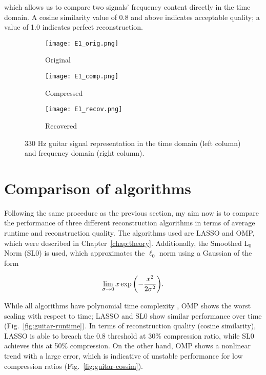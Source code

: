 \noindent which allows us to compare two signals' frequency content directly in the time domain. A cosine similarity value of 0.8 and above indicates acceptable quality; a value of 1.0 indicates perfect reconstruction.

\begin{figure}[htb]
	\centering
	\begin{subfigure}{\textwidth}
		\centering
		\texttt{[image: E1\_orig.png]}
		\caption{Original}
		\label{fig:guitar-original}
	\end{subfigure}
	\begin{subfigure}{\textwidth}
		\centering
		\texttt{[image: E1\_comp.png]}
		\caption{Compressed}
		\label{fig:guitar-compressed}
	\end{subfigure}
	\begin{subfigure}{\textwidth}
		\centering
		\texttt{[image: E1\_recov.png]}
		\caption{Recovered}
		\label{fig:guitar-recovered}
	\end{subfigure}
	\caption{330 Hz guitar signal representation in the time domain (left column) and frequency domain (right column).}
	\label{fig:guitar}
\end{figure}


\section{Comparison of algorithms}
\label{sec:audio-algorithms}
Following the same procedure as the previous section, my aim now is to compare the performance of three different reconstruction algorithms in terms of average runtime and reconstruction quality. The algorithms used are LASSO and OMP, which were described in Chapter~\ref{chap:theory}. Additionally, the Smoothed L$_0$ Norm (SL0) \cite{Mohimani2009} is used, which approximates the $\ell_0$ norm using a Gaussian of the form

\begin{equation}
\label{eq:sl0}
\lim_{\sigma \rightarrow 0} x \exp\qty(-\frac{x^2}{2\sigma^2}).
\end{equation}

While all algorithms have polynomial time complexity \cite{Efron2004,Sturm2012,Xiang2019}, OMP shows the worst scaling with respect to time; LASSO and SL0 show similar performance over time (Fig.~\ref{fig:guitar-runtime}). In terms of reconstruction quality (cosine similarity), LASSO is able to breach the 0.8 threshold at 30\% compression ratio, while SL0 achieves this at 50\% compression. On the other hand, OMP shows a nonlinear trend with a large error, which is indicative of unstable performance for low compression ratios (Fig.~\ref{fig:guitar-cossim}).

